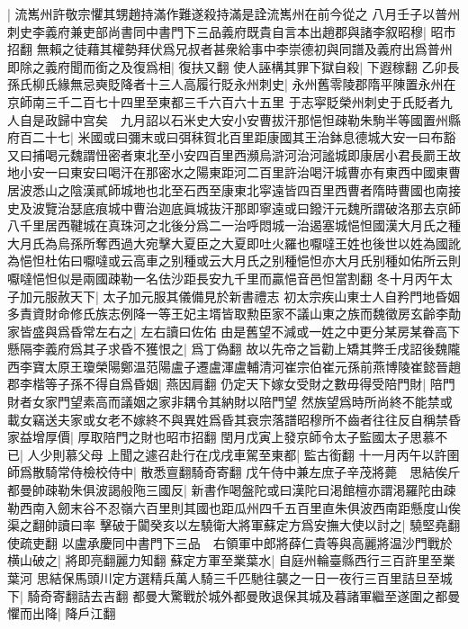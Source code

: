 |{
	流嶲州許敬宗懼其甥趙持滿作難遂殺持滿是詮流嶲州在前今從之}
八月壬子以普州刺史李義府兼吏部尚書同中書門下三品義府既貴自言本出趙郡與諸李叙昭穆|{
	昭市招翻}
無賴之徒藉其權勢拜伏爲兄叔者甚衆給事中李崇德初與同譜及義府出爲普州即除之義府聞而銜之及復爲相|{
	復扶又翻}
使人誣構其罪下獄自殺|{
	下遐稼翻}
乙卯長孫氏柳氏緣無忌奭貶降者十三人高履行貶永州刺史|{
	永州舊零陵郡隋平陳置永州在京師南三千二百七十四里至東都三千六百六十五里}
于志寜貶榮州刺史于氏貶者九人自是政歸中宫矣　九月詔以石米史大安小安曹拔汗那悒怛疎勒朱駒半等國置州縣府百二十七|{
	米國或曰彌末或曰弭秣賀北百里距康國其王治鉢息德城大安一曰布豁又曰捕喝元魏謂忸密者東北至小安四百里西瀕烏滸河治河謐城即康居小君長罽王故地小安一曰東安曰喝汗在那密水之陽東距河二百里許治喝汗城曹亦有東西中國東曹居波悉山之陰漢貳師城地也北至石西至康東北寜遠皆四百里西曹者隋時曹國也南接史及波覽治瑟底痕城中曹治迦底眞城抜汗那即寧遠或曰鏺汗元魏所謂破洛那去京師八千里居西鞬城在真珠河之北後分爲二一治呼悶城一治遏塞城悒怛國漢大月氏之種大月氏為烏孫所奪西過大宛擊大夏臣之大夏即吐火羅也嚈噠王姓也後世以姓為國訛為悒怛杜佑曰嚈噠或云高車之别種或云大月氏之别種悒怛亦大月氏别種如佑所云則嚈噠悒怛似是兩國疎勒一名佉沙距長安九千里而贏悒音邑怛當割翻}
冬十月丙午太子加元服赦天下|{
	太子加元服其儀備見於新書禮志}
初太宗疾山東士人自矜門地昏姻多責資財命修氏族志例降一等王妃主壻皆取勲臣家不議山東之族而魏徵房玄齡李勣家皆盛與爲昏常左右之|{
	左右讀曰佐佑}
由是舊望不減或一姓之中更分某房某眷高下懸隔李義府爲其子求昏不獲恨之|{
	爲丁偽翻}
故以先帝之旨勸上矯其弊壬戌詔後魏隴西李寶太原王瓊榮陽鄭温范陽盧子遷盧渾盧輔清河崔宗伯崔元孫前燕博陵崔懿晉趙郡李楷等子孫不得自爲昏姻|{
	燕因肩翻}
仍定天下嫁女受財之數毋得受陪門財|{
	陪門財者女家門望素高而議姻之家非耦令其納財以陪門望}
然族望爲時所尚終不能禁或載女竊送夫家或女老不嫁終不與異姓爲昏其衰宗落譜昭穆所不齒者往往反自稱禁昏家益增厚價|{
	厚取陪門之財也昭市招翻}
閏月戊寅上發京師令太子監國太子思慕不已|{
	人少則慕父母}
上聞之遽召赴行在戊戌車駕至東都|{
	監古銜翻}
十一月丙午以許圉師爲散騎常侍檢校侍中|{
	散悉亶翻騎奇寄翻}
戊午侍中兼左庶子辛茂將薨　思結俟斤都曼帥疎勒朱俱波謁般陁三國反|{
	新書作喝盤陀或曰漢陀曰渇館檀亦謂渇羅陀由疎勒西南入劒末谷不忍嶺六百里則其國也距瓜州四千五百里直朱俱波西南距懸度山俟渠之翻帥讀曰率}
擊破于闐癸亥以左驍衛大將軍蘇定方爲安撫大使以討之|{
	驍堅堯翻使疏吏翻}
以盧承慶同中書門下三品　右領軍中郎將薛仁貴等與高麗將温沙門戰於横山破之|{
	將即亮翻麗力知翻}
蘇定方軍至業葉水|{
	自庭州輪臺縣西行三百許里至業葉河}
思結保馬頭川定方選精兵萬人騎三千匹馳往襲之一日一夜行三百里詰旦至城下|{
	騎奇寄翻詰去吉翻}
都曼大驚戰於城外都曼敗退保其城及暮諸軍繼至遂圍之都曼懼而出降|{
	降戶江翻}


